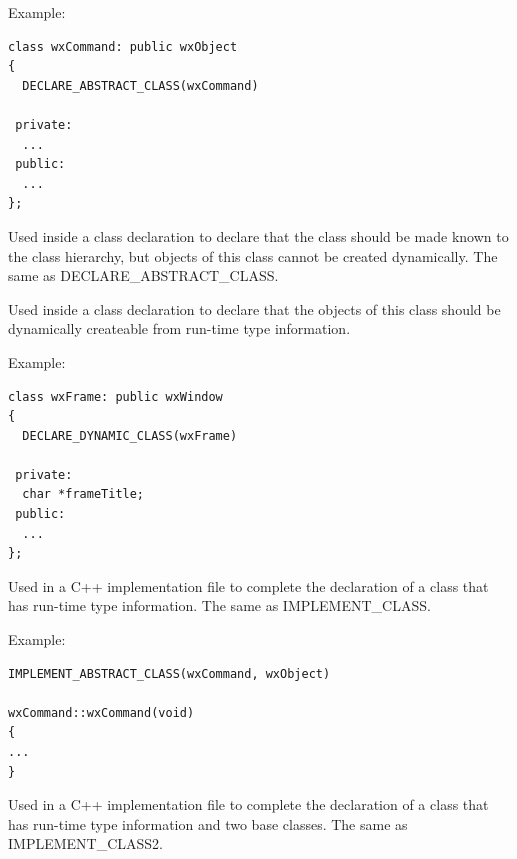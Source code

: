 Example:

\begin{verbatim}
class wxCommand: public wxObject
{
  DECLARE_ABSTRACT_CLASS(wxCommand)

 private:
  ...
 public:
  ...
};
\end{verbatim}



Used inside a class declaration to declare that the class should be
made known to the class hierarchy, but objects of this class cannot be created
dynamically. The same as DECLARE\_ABSTRACT\_CLASS.



Used inside a class declaration to declare that the objects of this class should be dynamically
createable from run-time type information.

Example:

\begin{verbatim}
class wxFrame: public wxWindow
{
  DECLARE_DYNAMIC_CLASS(wxFrame)

 private:
  char *frameTitle;
 public:
  ...
};
\end{verbatim}



Used in a C++ implementation file to complete the declaration of
a class that has run-time type information. The same as IMPLEMENT\_CLASS.

Example:

\begin{verbatim}
IMPLEMENT_ABSTRACT_CLASS(wxCommand, wxObject)

wxCommand::wxCommand(void)
{
...
}
\end{verbatim}



Used in a C++ implementation file to complete the declaration of
a class that has run-time type information and two base classes. The same as IMPLEMENT\_CLASS2.


